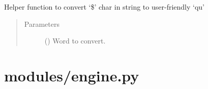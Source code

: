 \documentclass[letterpaper,10pt,english]{sphinxmanual}
\begin{document}
\begin{fulllineitems}
\begin{fulllineitems}
Helper function to convert ‘\$’ char in string to
user-friendly ‘qu’
\begin{quote}\begin{description}
\item[{Parameters}] \leavevmode
{} () \textendash{} Word to convert.

\end{description}\end{quote}

\end{fulllineitems}


\end{fulllineitems}



\section{modules/engine.py}
\label{\detokenize{index:modules-engine-py}}
\end{document}
